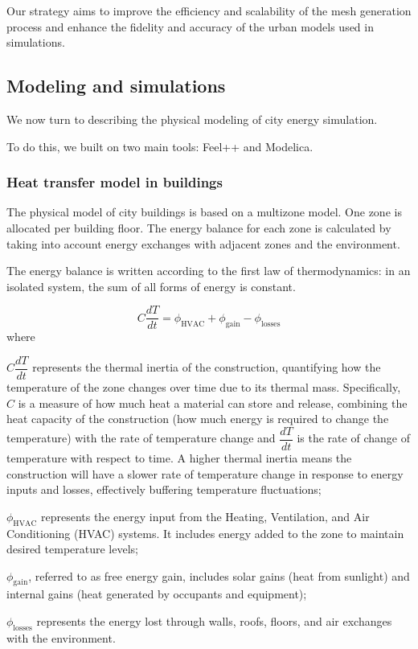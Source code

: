 \documentclass[runningheads]{llncs}
\begin{document}
Our strategy aims to improve the efficiency and scalability of the mesh generation process and enhance the fidelity and accuracy of the urban models used in simulations.

\subsection{Modeling and simulations}

We now turn to describing the physical modeling of city energy simulation.

To do this, we built on two main tools: Feel++ and Modelica.

\subsubsection{Heat transfer model in buildings}
\label{sec:heat-transfer-in-buildings}

The physical model of city buildings is based on a multizone model.
One zone is allocated per building floor. 
The energy balance for each zone is calculated by taking into account energy exchanges with adjacent zones and the environment.

The energy balance is written according to the first law of thermodynamics: in an isolated system, the sum of all forms of energy is constant.

\begin{equation}
    C \frac{dT}{dt} = \phi_{\mathrm{HVAC}} + \phi_{\mathrm{gain}} - \phi_{\mathrm{losses}}
\end{equation}
where
\begin{inparaenum}[\it (i)]
    \item $C \dfrac{dT}{dt}$ represents the thermal inertia of the construction, quantifying how the temperature of the zone changes over time due to its thermal mass. Specifically,
    $C$ is a measure of how much heat a material can store and release, combining the heat capacity of the construction (how much energy is required to change the temperature) with the rate of temperature change and 
    $\dfrac{dT}{dt}$ is the rate of change of temperature with respect to time. A higher thermal inertia means the construction will have a slower rate of temperature change in response to energy inputs and losses, effectively buffering temperature fluctuations;
    \item $\phi_{\mathrm{HVAC}}$ represents the energy input from the Heating, Ventilation, and Air Conditioning (HVAC) systems. It includes energy added to the zone to maintain desired temperature levels;
    \item $\phi_{\mathrm{gain}}$, referred to as free energy gain, includes solar gains (heat from sunlight) and internal gains (heat generated by occupants and equipment);
    \item $\phi_{\mathrm{losses}}$ represents the energy lost through walls, roofs, floors, and air exchanges with the environment.
\end{inparaenum}
\end{document}

